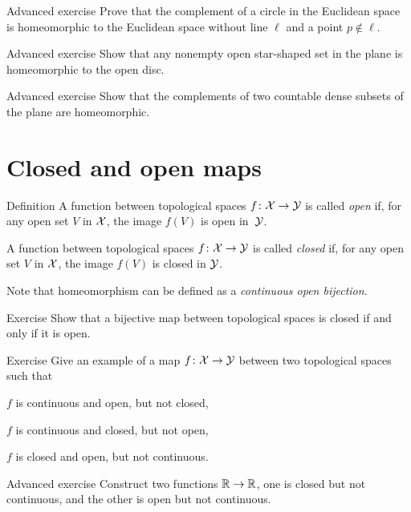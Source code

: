 \begin{thm}{Advanced exercise}
Prove that the complement of a circle in the Euclidean space is homeomorphic to the Euclidean space without line $\ell$ and a point $p\not\in\ell$.
\end{thm}

\begin{thm}{Advanced exercise}
Show that any nonempty open star-shaped set in the plane is homeomorphic to the open disc.
\end{thm}

\begin{thm}{Advanced exercise}
Show that the complements of two countable dense subsets of the plane are homeomorphic.
\end{thm}

\section{Closed and open maps}

\begin{thm}{Definition}\label{def:cont-top}
A function between topological spaces 
$f\colon\mathcal{X}\to\mathcal{Y}$ is called \emph{open} if, for any open set $V$ in $\mathcal{X}$, the image $f(V)$ is open in~$\mathcal{Y}$.

A function between topological spaces 
$f\colon\mathcal{X}\to\mathcal{Y}$ is called \emph{closed} if, for any open set $V$ in $\mathcal{X}$, the image $f(V)$ is closed in $\mathcal{Y}$.
\end{thm}

Note that homeomorphism can be defined as a \emph{continuous open bijection}.

\begin{thm}{Exercise}
Show that a bijective map between topological spaces is closed if and only if it is open.
\end{thm}

\begin{thm}{Exercise}
Give an example of a map $f\colon\mathcal{X}\to\mathcal{Y}$ between two topological spaces such that 
\begin{subthm}{}
$f$ is continuous and open, but not closed,
\end{subthm}

\begin{subthm}{}
$f$ is continuous and closed, but not open,
\end{subthm}

\begin{subthm}{}
$f$ is closed and open, but not continuous.
\end{subthm}

\end{thm}

\begin{thm}{Advanced exercise}
Construct two functions $\mathbb{R}\to\mathbb{R}$, one is closed but not continuous, and the other is open but not continuous.
\end{thm}


